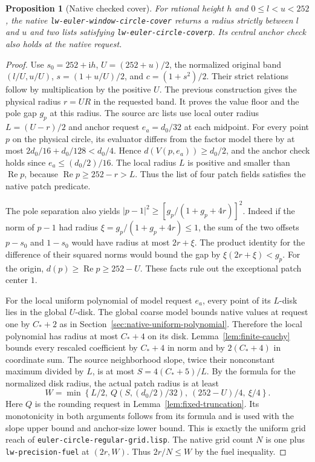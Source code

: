\documentclass[11pt]{amsart}
\newtheorem{proposition}[theorem]{Proposition}
\theoremstyle{definition}
\theoremstyle{remark}
\numberwithin{equation}{section}
\newcommand{\re}{\operatorname{Re}}
\newcommand{\code}[1]{\nolinkurl{#1}}
\begin{document}
\begin{proposition}[Native checked cover]\label{prop:native-cover}
For rational height $h$ and $0\le l<u<252$, the native
\code{lw-euler-window-circle-cover} returns a radius
strictly between $l$ and $u$ and two lists satisfying
\code{lw-euler-circle-coverp}. Its central anchor check
also holds at the native request.
\end{proposition}
\begin{proof}
Use $s_0=252+\mathrm i h$, $U=(252+u)/2$, the
normalized original band $(l/U,u/U)$,
$s=(1+u/U)/2$, and $c=(1+s^2)/2$. Their strict
relations follow by multiplication by the positive $U$.
The previous construction gives the physical radius
$r=UR$ in the requested band. It proves the value
floor and the pole gap $g_p$ at this radius. The source
arc lists use local outer radius $L=(U-r)/2$ and
anchor request $e_a=d_0/32$ at each midpoint.
For every point $p$ on the physical circle, its evaluator
differs from the factor model there by at most
$2d_0/16+d_0/128<d_0/4$. Hence
$d(V(p,e_a))\ge d_0/2$, and the anchor check holds since
$e_a\le(d_0/2)/16$. The local radius $L$ is positive
and smaller than $\re p$, because $\re p\ge252-r>L$.
Thus the list of four patch fields satisfies the native
patch predicate.

The pole separation also yields
$|p-1|^2\ge[g_p/(1+g_p+4r)]^2$.
Indeed if the norm of $p-1$ had radius
$\xi=g_p/(1+g_p+4r)\le1$, the sum of the two offsets
$p-s_0$ and $1-s_0$ would have radius at most $2r+\xi$.
The product identity for the difference of their squared
norms would bound the gap by $\xi(2r+\xi)<g_p$.
For the origin, $d(p)\ge\re p\ge252-U$.
These facts rule out the exceptional patch center $1$.

For the local uniform polynomial of model request $e_a$,
every point of its $L$-disk lies in the global $U$-disk.
The global coarse model bounds native values at request
one by $C_*+2$ as in
Section~\ref{sec:native-uniform-polynomial}. Therefore
the local polynomial has radius at most $C_*+4$ on
its disk. Lemma~\ref{lem:finite-cauchy} bounds every
rescaled coefficient by $C_*+4$ in norm and by
$2(C_*+4)$ in coordinate sum. The source neighborhood
slope, twice their nonconstant maximum divided by $L$,
is at most $S=4(C_*+5)/L$.
By the formula for the normalized disk radius, the
actual patch radius is at least
\[
 W=\min\left\{L/2,\ Q(S,(d_0/2)/32),\
                  (252-U)/4,\ \xi/4\right\}.
\]
Here $Q$ is the rounding request in
Lemma~\ref{lem:fixed-truncation}. Its monotonicity in
both arguments follows from its formula and is used
with the slope upper bound and anchor-size lower bound.
This is exactly the uniform grid reach of
\code{euler-circle-regular-grid.lisp}.
The native grid count $N$ is one plus \code{lw-precision-fuel}
at $(2r,W)$. Thus $2r/N\le W$ by the fuel inequality.


\end{proof}
\end{document}
